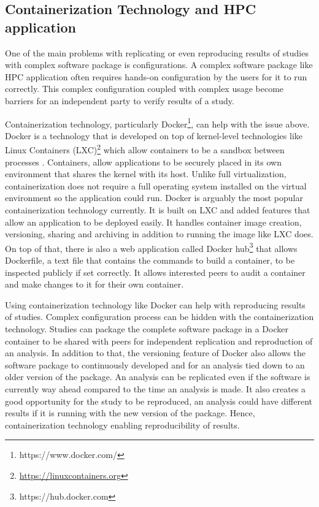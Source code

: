 \subsection{Containerization Technology and HPC application}




One of the main problems with replicating or even reproducing results of studies with complex software package is configurations. A complex software package like HPC application often requires hands-on configuration by the users for it to run correctly. This complex configuration coupled with complex usage become barriers for an independent party to verify results of a study.

Containerization technology, particularly Docker\footnote{https://www.docker.com/}, can help with the issue above. Docker is a technology that is developed on top of kernel-level technologies like Linux Containers (LXC)\footnote{\url{https://linuxcontainers.org}} which allow containers to be a sandbox between processes \citep{merkel2014docker}. Containers, allow applications to be securely placed in its own environment that shares the kernel with its host. Unlike full virtualization, containerization does not require a full operating system installed on the virtual environment so the application could run. Docker is arguably the most popular containerization technology currently. It is built on LXC and added features that allow an application to be deployed easily. It handles container image creation, versioning, sharing and archiving in addition to running the image like LXC does. On top of that, there is also a web application called Docker hub\footnote{https://hub.docker.com} that allows Dockerfile, a text file that contains the commands to build a container, to be inspected publicly if set correctly. It allows interested peers to audit a container and make changes to it for their own container.

Using containerization technology like Docker can help with reproducing results of studies. Complex configuration process can be hidden with the containerization technology. Studies can package the complete software package in a Docker container to be shared with peers for independent replication and reproduction of an analysis. In addition to that, the versioning feature of Docker also allows the software package to continuously developed and for an analysis tied down to an older version of the package. An analysis can be replicated even if the software is currently way ahead compared to the time an analysis is made. It  also creates a good opportunity for the study to be reproduced, an analysis could have different results if it is running with the new version of the package. Hence, containerization technology enabling reproducibility of results.


